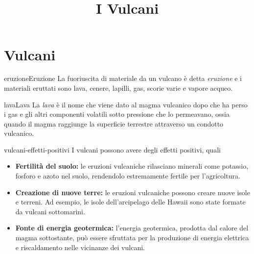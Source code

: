 \documentclass[preview]{standalone}
\begin{document}
\title{I Vulcani}
\genpage

\section{Vulcani}

\begin{snippetdefinition}{eruzione}{Eruzione}
    La fuoriuscita di materiale da un vulcano è detta \textit{eruzione}
    e i materiali eruttati sono lava, cenere, lapilli, gas, scorie varie e vapore acqueo.
\end{snippetdefinition}


\begin{snippetdefinition}{lava}{Lava}
    La \textit{lava} è il nome che viene dato al magma vulcanico
    dopo che ha perso i gas e gli altri componenti volatili sotto pressione che lo permeavano,
    ossia quando il magma raggiunge la superficie terrestre attraverso un condotto vulcanico.
\end{snippetdefinition}


\begin{snippet}{vulcani-effetti-positivi}
    I vulcani possono avere degli effetti positivi, quali
    \begin{itemize}
        \item \textbf{Fertilità del suolo:} le eruzioni vulcaniche rilasciano minerali come potassio,
            fosforo e azoto nel suolo, rendendolo estremamente fertile per l'agricoltura.
        \item \textbf{Creazione di nuove terre:} le eruzioni vulcaniche possono creare nuove isole
            e terreni. Ad esempio, le isole dell'arcipelago delle Hawaii sono state formate
            da vulcani sottomarini.
        \item \textbf{Fonte di energia geotermica:} l'energia geotermica, prodotta dal calore
            del magma sottostante, può essere sfruttata per la produzione
            di energia elettrica e riscaldamento nelle vicinanze dei vulcani.
    \end{itemize}
\end{snippet}
\end{document}
